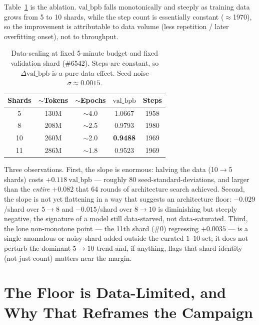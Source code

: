 \documentclass{article}
\newcommand{\valbpb}{\mathrm{val\_bpb}}
\begin{document}
Table~\ref{tab:data} is the ablation. $\valbpb$ falls monotonically and steeply as training data grows from 5 to 10 shards, while the step count is essentially constant ($\approx$1970), so the improvement is attributable to data volume (less repetition / later overfitting onset), not to throughput.

\begin{table}[t]
\caption{Data-scaling at fixed 5-minute budget and fixed validation shard (\#6542). Steps are constant, so $\Delta\valbpb$ is a pure data effect. Seed noise $\sigma\approx0.0015$.}
\label{tab:data}
\vskip 0.1in
\begin{center}
\begin{small}
\begin{tabular}{ccccc}
\toprule
Shards & $\sim$Tokens & $\sim$Epochs & $\valbpb$ & Steps \\
\midrule
5  & 130M & $\sim$4.0 & 1.0667 & 1958 \\
8  & 208M & $\sim$2.5 & 0.9793 & 1980 \\
10 & 260M & $\sim$2.0 & \textbf{0.9488} & 1969 \\
11 & 286M & $\sim$1.8 & 0.9523 & 1969 \\
\bottomrule
\end{tabular}
\end{small}
\end{center}
\vskip -0.15in
\end{table}

Three observations. First, the slope is enormous: halving the data (10$\to$5 shards) costs $+0.118\ \valbpb$ --- roughly 80 seed-standard-deviations, and larger than the \emph{entire} $+0.082$ that 64 rounds of architecture search achieved. Second, the slope is not yet flattening in a way that suggests an architecture floor: $-0.029$/shard over $5\to8$ and $-0.015$/shard over $8\to10$ is diminishing but steeply negative, the signature of a model still data-starved, not data-saturated. Third, the lone non-monotone point --- the 11th shard (\#0) regressing $+0.0035$ --- is a single anomalous or noisy shard added outside the curated $1$--$10$ set; it does not perturb the dominant $5\to10$ trend and, if anything, flags that shard identity (not just count) matters near the margin.

\section{The Floor is Data-Limited, and Why That Reframes the Campaign}
\label{sec:reframe}
\end{document}
